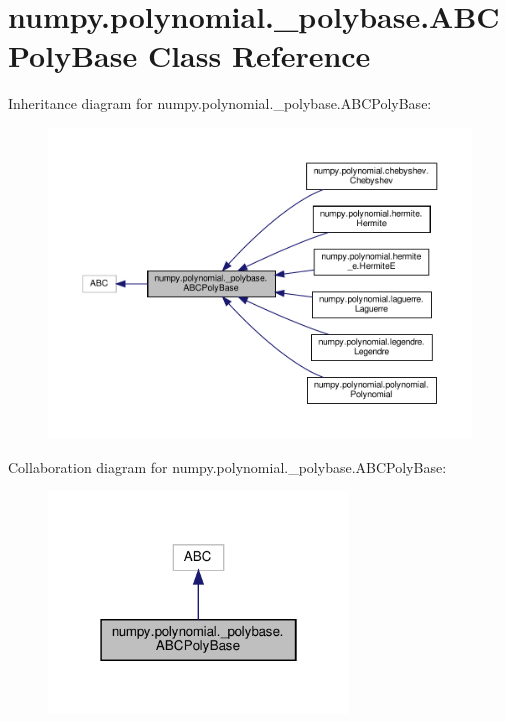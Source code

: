 \hypertarget{classnumpy_1_1polynomial_1_1__polybase_1_1ABCPolyBase}{}\section{numpy.\+polynomial.\+\_\+polybase.\+A\+B\+C\+Poly\+Base Class Reference}
\label{classnumpy_1_1polynomial_1_1__polybase_1_1ABCPolyBase}


Inheritance diagram for numpy.\+polynomial.\+\_\+polybase.\+A\+B\+C\+Poly\+Base\+:
\nopagebreak
\begin{figure}[H]
\begin{center}
\leavevmode
\includegraphics[width=350pt]{classnumpy_1_1polynomial_1_1__polybase_1_1ABCPolyBase__inherit__graph}
\end{center}
\end{figure}


Collaboration diagram for numpy.\+polynomial.\+\_\+polybase.\+A\+B\+C\+Poly\+Base\+:
\nopagebreak
\begin{figure}[H]
\begin{center}
\leavevmode
\includegraphics[width=226pt]{classnumpy_1_1polynomial_1_1__polybase_1_1ABCPolyBase__coll__graph}
\end{center}
\end{figure}
